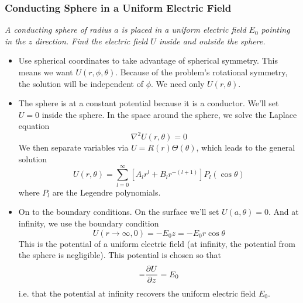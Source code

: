 \documentclass[11pt, a4paper]{article}
\renewcommand{\laplacian}{\nabla^{2}}
\begin{document}
\subsubsection{Conducting Sphere in a Uniform Electric Field}
\textit{A conducting sphere of radius $ a $ is placed in a uniform electric field $ E_{0} $ pointing in the $ z $ direction. Find the electric field $ U $ inside and outside the sphere.} 

\begin{itemize}
	\item Use spherical coordinates to take advantage of spherical symmetry. This means we want $ U(r, \phi, \theta) $. Because of the problem's rotational symmetry, the solution will be independent of $ \phi $. We need only $ U(r, \theta) $. 
	
	\item The sphere is at a constant potential because it is a conductor. We'll set $ U = 0 $ inside the sphere. In the space around the sphere, we solve the Laplace equation
	\begin{equation*}
		\laplacian U(r, \theta) = 0
	\end{equation*}
	We then separate variables via $ U = R(r)\Theta(\theta) $, which leads to the general solution
	\begin{equation*}
		U(r, \theta) = \sum_{l = 0}^{\infty} \left[A_{l}r^{l}+B_{l}r^{-(l+1)}\right]P_{l}(\cos \theta)
	\end{equation*}
	where $ P_{l} $ are the Legendre polynomials. 
	
	\item On to the boundary conditions. On the surface we'll set $ U(a, \theta) = 0 $. And at infinity, we use the boundary condition 
	\begin{equation*}
		U(r \to \infty, 0) = - E_{0}z = -E_{0}r \cos \theta
	\end{equation*}
	This is the potential of a uniform electric field (at infinity, the potential from the sphere is negligible). This potential is chosen so that
	\begin{equation*}
		- \pdv{U}{z} = E_{0}
	\end{equation*}
	i.e. that the potential at infinity recovers the uniform electric field $ E_{0} $. 
	

\end{itemize}
\end{document}

